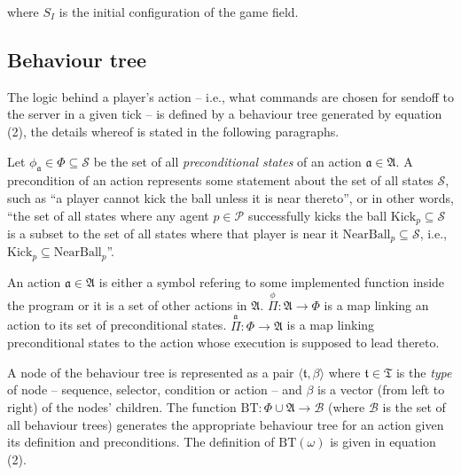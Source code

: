 where \(S_I\) is the initial configuration of the game field.

\subsection{Behaviour tree}
The logic behind a player's action -- i.e., what commands are chosen for sendoff to the server in a given tick -- is defined by a behaviour tree generated by equation (2), the details whereof is stated in the following paragraphs.

Let \(\phi_\mathfrak{a}\in\Phi\subseteq\mathcal{S}\) be the set of all \textit{preconditional states} of an action \(\mathfrak{a}\in\mathfrak{A}\). A precondition of an action represents some statement about the set of all states \(\mathcal{S}\), such as ``a player cannot kick the ball unless it is near thereto'', or in other words, ``the set of all states where any agent \(p\in\mathcal{P}\) successfully kicks the ball \(\text{Kick}_p \subseteq \mathcal{S}\) is a subset to the set of all states where that player is near it \(\text{NearBall}_p \subseteq \mathcal{S}\), i.e., \(\text{Kick}_p \subseteq \text{NearBall}_p\)''.

An action \(\mathfrak{a}\in\mathfrak{A}\) is either a symbol refering to some implemented function inside the program or it is a set of other actions in \(\mathfrak{A}\). \(\overset{\phi}\Pi : \mathfrak{A} \to \Phi\) is a map linking an action to its set of preconditional states. \(\overset{\mathfrak{a}}\Pi : \Phi \to \mathfrak{A}\) is a map linking preconditional states to the action whose execution is supposed to lead thereto.

A node of the behaviour tree is represented as a pair \(\langle \mathfrak{t}, \beta \rangle\) where \(\mathfrak{t}\in\mathfrak{T}\) is the \textit{type} of node -- sequence, selector, condition or action -- and \(\beta\) is a vector (from left to right) of the nodes' children. The function \(\text{BT}:\Phi\cup\mathfrak{A} \to \mathscr{B}\) (where \(\mathscr{B}\) is the set of all behaviour trees) generates the appropriate behaviour tree for an action given its definition and preconditions. The definition of \(\text{BT}(\omega)\) is given in equation (2).


